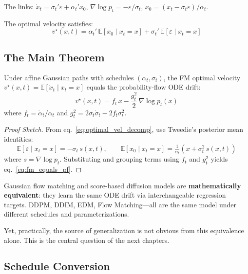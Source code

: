 \documentclass[11pt, a4paper]{article}
\newcommand{\E}{\mathbb{E}}
\newcommand{\grad}{\nabla}
\theoremstyle{plain}
\theoremstyle{definition}
\theoremstyle{remark}
\begin{document}
The links: $\dot{x}_t = \sigma_t' \varepsilon + \alpha_t' x_0$, $\grad \log p_t = -\varepsilon/\sigma_t$, $x_0 = (x_t - \sigma_t \varepsilon)/\alpha_t$.

The optimal velocity satisfies:
\begin{equation}
  v^\star(x, t) = \alpha_t'\,\E[x_0 \mid x_t = x] + \sigma_t'\,\E[\varepsilon \mid x_t = x]
  \label{eq:optimal_vel_decomp}
\end{equation}

\subsection{The Main Theorem}

\begin{thmbox}[Theorem: FM Velocity $=$ PF-ODE Drift]
\label{thm:equivalence}
Under affine Gaussian paths with schedules $(\alpha_t, \sigma_t)$, the FM optimal velocity $v^\star(x, t) = \E[\dot{x}_t \mid x_t = x]$ equals the probability-flow ODE drift:
\begin{equation}
  \boxed{v^\star(x, t) = f_t\,x - \frac{g_t^2}{2}\,\grad \log p_t(x)}
  \label{eq:fm_equals_pf}
\end{equation}
where $f_t = \dot{\alpha}_t / \alpha_t$ and $g_t^2 = 2\sigma_t \dot{\sigma}_t - 2 f_t \sigma_t^2$.
\end{thmbox}

\begin{proof}[Proof Sketch]
From eq.~\eqref{eq:optimal_vel_decomp}, use Tweedie's posterior mean identities:
\[
  \E[\varepsilon \mid x_t=x] = -\sigma_t\, s(x,t), \qquad \E[x_0 \mid x_t=x] = \tfrac{1}{\alpha_t}(x + \sigma_t^2\, s(x,t))
\]
where $s = \grad \log p_t$. Substituting and grouping terms using $f_t$ and $g_t^2$ yields eq.~\eqref{eq:fm_equals_pf}.
\end{proof}

\begin{keybox}
Gaussian flow matching and score-based diffusion models are \textbf{mathematically equivalent}: they learn the same ODE drift via interchangeable regression targets. DDPM, DDIM, EDM, Flow Matching---all are the same model under different schedules and parameterizations.

Yet, practically, the source of generalization is not obvious from this equivalence alone. This is the central question of the next chapters.
\end{keybox}

\subsection{Schedule Conversion}
\end{document}
